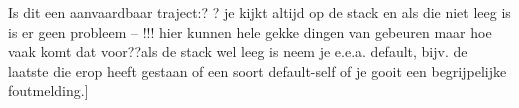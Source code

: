 \documentclass[a4paper,12pt]{book}
\begin{document}
Is dit een aanvaardbaar traject:? ?	je kijkt altijd op de stack en als die niet leeg is is er geen probleem -- !!! hier kunnen hele gekke dingen van gebeuren maar hoe vaak komt dat voor??als de stack wel leeg is neem je e.e.a. default, bijv. de laatste die erop heeft gestaan of een soort default-self of je gooit een begrijpelijke foutmelding.]






\end{document}
